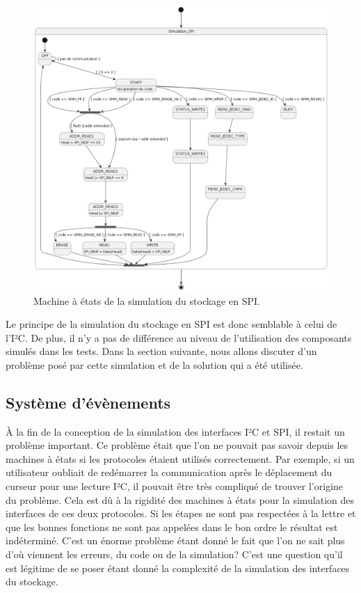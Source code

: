 \documentclass[a4paper]{article}
\begin{document}
\begin{figure}[h!]
  \begin{center}
    \includegraphics[scale=0.4]{./graphs/sm-spi.png}
    \caption{Machine à états de la simulation du stockage en SPI.}
    \label{fig:smspi}
  \end{center}
\end{figure}

Le principe de la simulation du stockage en SPI est donc semblable à celui de
l'I²C. De plus, il n'y a pas de différence au niveau de l'utilisation des
composants simulés dans les tests. Dans la section suivante, nous allons discuter
d'un problème posé par cette simulation et de la solution qui a été utilisée.
\subsection{Système d'évènements}%

À la fin de la conception de la simulation des interfaces I²C et SPI, il restait
un problème important. Ce problème était que l'on ne pouvait pas savoir depuis
les machines à états si les protocoles étaient utilisés correctement. Par
exemple, si un utilisateur oubliait de redémarrer la communication après le
déplacement du curseur pour une lecture I²C, il pouvait être très compliqué de
trouver l'origine du problème. Cela est dû à la rigidité des machines à états
pour la simulation des interfaces de ces deux protocoles. Si les étapes ne sont
pas respectées à la lettre et que les bonnes fonctions ne sont pas appelées
dans le bon ordre le résultat est indéterminé. C'est un énorme problème étant
donné le fait que l'on ne sait plus d'où viennent les erreurs, du code ou de la
simulation? C'est une question qu'il est légitime de se poser étant donné la
complexité de la simulation des interfaces du stockage.
\end{document}
